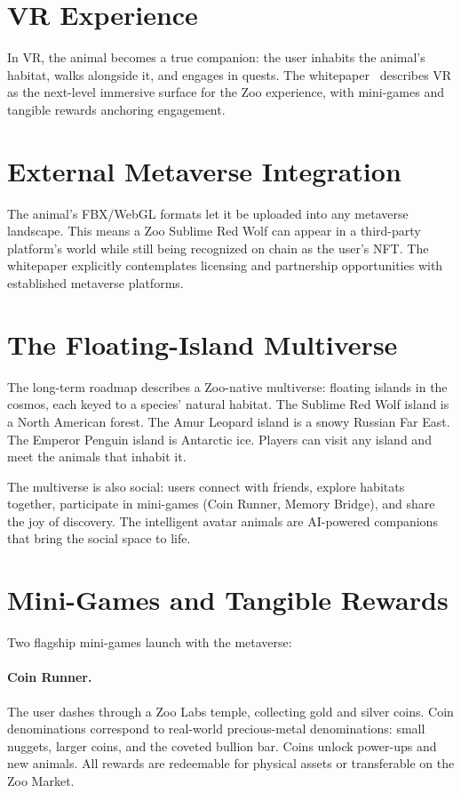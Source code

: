 \documentclass[11pt,letterpaper]{article}
\begin{document}
\section{VR Experience}

In VR, the animal becomes a true companion: the user inhabits the animal's habitat, walks alongside it, and engages in quests. The whitepaper~\cite{zoo2021} describes VR as the next-level immersive surface for the Zoo experience, with mini-games and tangible rewards anchoring engagement.

\section{External Metaverse Integration}

The animal's FBX/WebGL formats let it be uploaded into any metaverse landscape. This means a Zoo Sublime Red Wolf can appear in a third-party platform's world while still being recognized on chain as the user's NFT. The whitepaper explicitly contemplates licensing and partnership opportunities with established metaverse platforms.

\section{The Floating-Island Multiverse}

The long-term roadmap describes a Zoo-native multiverse: floating islands in the cosmos, each keyed to a species' natural habitat. The Sublime Red Wolf island is a North American forest. The Amur Leopard island is a snowy Russian Far East. The Emperor Penguin island is Antarctic ice. Players can visit any island and meet the animals that inhabit it.

The multiverse is also social: users connect with friends, explore habitats together, participate in mini-games (Coin Runner, Memory Bridge), and share the joy of discovery. The intelligent avatar animals are AI-powered companions that bring the social space to life.

\section{Mini-Games and Tangible Rewards}

Two flagship mini-games launch with the metaverse:

\paragraph{Coin Runner.} The user dashes through a Zoo Labs temple, collecting gold and silver coins. Coin denominations correspond to real-world precious-metal denominations: small nuggets, larger coins, and the coveted bullion bar. Coins unlock power-ups and new animals. All rewards are redeemable for physical assets or transferable on the Zoo Market.
\end{document}

